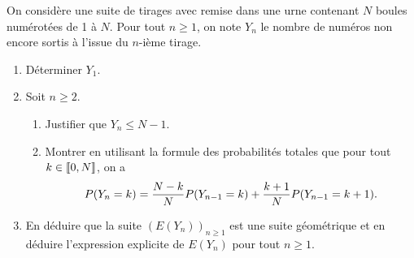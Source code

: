 \documentclass[a4paper, 11pt,reqno]{article}
\begin{document}
\begin{exercice}  \;
	\noindent On consid\`{e}re une suite de tirages avec remise dans une urne contenant $N$ boules num\'erot\'ees de 1 \`{a} $N$. Pour tout $n\geq 1$, on note $Y_n$ le nombre de num\'eros non encore sortis \`{a} l'issue du $n$-i\`{e}me tirage.
	\begin{enumerate}
		\item D\'eterminer $Y_1$.
		\item Soit $n\geq 2$.
		      \begin{enumerate}
			      \item Justifier que $Y_n\leq N-1$.
			      \item Montrer en utilisant la formule des probabilit\'es totales que pour tout $k\in\llbracket  0,N\rrbracket$, on a
			            $$P(Y_n=k)=\displaystyle\frac{N-k}{N}P(Y_{n-1}=k)+\displaystyle\frac{k+1}{N}P(Y_{n-1}=k+1).$$
		      \end{enumerate}
		\item En d\'eduire que la suite $(E(Y_n))_{n\geq 1}$ est une suite g\'eom\'etrique et en d\'eduire l'expression explicite de $E(Y_n)$ pour tout $n\geq 1$.
	\end{enumerate}
\end{exercice}
\end{document}

